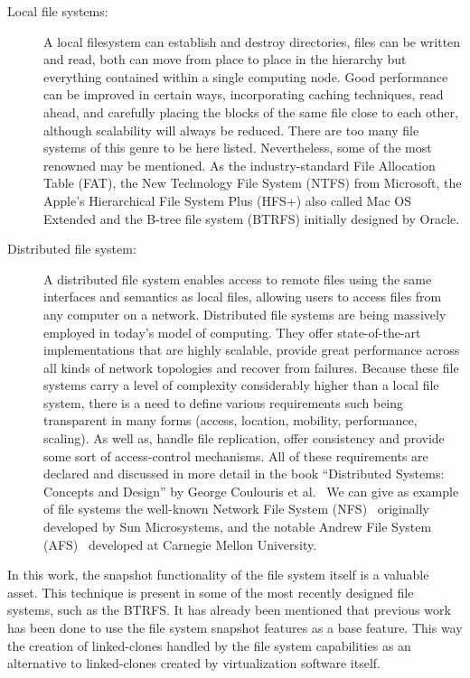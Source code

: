 \begin{description}
	\item [Local file systems:] A local filesystem can establish and destroy directories, files can be written and read, both can move from place to place in the hierarchy but everything contained within a single computing node. 
		Good performance can be improved in certain ways, incorporating caching techniques, read ahead, and carefully placing the blocks of the same file close to each other, although scalability will always be reduced. 
		There are too many file systems of this genre to be here listed. Nevertheless, some of the most renowned may be mentioned. As the industry-standard File Allocation Table (FAT), the New Technology File System (NTFS) from Microsoft, the Apple's Hierarchical File System Plus (HFS+) also called Mac OS Extended and the B-tree file system (BTRFS) initially designed by Oracle.
	\item [Distributed file system:] A distributed file system enables access to remote files using the same interfaces and semantics as local files, allowing users to access files from any computer on a network. 
		Distributed file systems are being massively employed in today's model of computing. They offer state-of-the-art implementations that are highly scalable, provide great performance across all kinds of network topologies and recover from failures. 
		Because these file systems carry a level of complexity considerably higher than a local file system, there is a need to define various requirements such being transparent in many forms (access, location, mobility, performance, scaling). As well as, handle file replication, offer consistency and provide some sort of access-control mechanisms. 
		All of these requirements are declared and discussed in more detail in the book \enquote{Distributed Systems: Concepts and Design} by George Coulouris et al.~\cite{Coulouris2011}
		We can give as example of file systems the well-known Network File System (NFS)~\cite{rfc5661} originally developed by Sun Microsystems, and the notable Andrew File System (AFS)~\cite{Satyanarayanan1990} developed at Carnegie Mellon University.
\end{description}


In this work, the snapshot functionality of the file system itself is a valuable asset. This technique is present in some of the most recently designed file systems, such as the BTRFS. It has already been mentioned that previous work has been done to use the file system snapshot features as a base feature. This way the creation of linked-clones handled by the file system capabilities as an alternative to linked-clones created by virtualization software itself.


